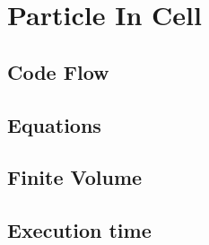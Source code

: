 \section{Particle In Cell}
\subsection{Code Flow}
\subsection{Equations}
\subsection{Finite Volume}
\subsection{Execution time}
